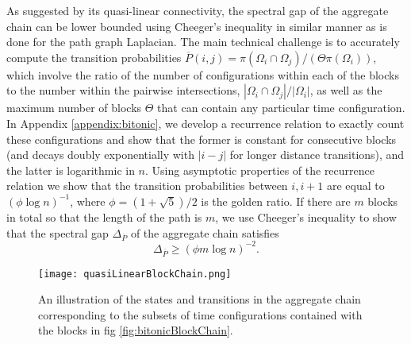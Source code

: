\documentclass[11pt,letterpaper]{article}
\theoremstyle{definition}
\theoremstyle{remark}
\renewcommand{\geq}{\geqslant}
\numberwithin{equation}{section}
\theoremstyle{definition}
\begin{document}
As suggested by its quasi-linear connectivity, the spectral gap of the aggregate chain can be lower bounded using Cheeger's inequality in similar manner as is done for the path graph Laplacian.  The main technical challenge is to accurately compute the transition probabilities $\overline{P}(i,j) = \pi(\Omega_i \cap \Omega_j) / \left(\Theta \pi(\Omega_i)\right)$, which involve the ratio of the number of configurations within each of the blocks to the number within the pairwise intersections, $|\Omega_i \cap \Omega_j| / |\Omega_i|$, as well as the maximum number of blocks $\Theta$ that can contain any particular time configuration.  In Appendix \ref{appendix:bitonic}, we develop a recurrence relation to exactly count these configurations and show that the former is constant for consecutive blocks (and decays doubly exponentially with $|i - j|$ for longer distance transitions), and the latter is logarithmic in $n$.  Using asymptotic properties of the recurrence relation we show that the transition probabilities between $i,i+1$ are equal to $(\phi\log n)^{-1}$, where $\phi = (1 + \sqrt{5})/2$ is the golden ratio.  If there are $m$ blocks in total so that the length of the path is $m$, we use Cheeger's inequality to show that the spectral gap $\Delta_{\overline{P}}$ of the aggregate chain satisfies
\begin{equation}
\Delta_{\overline{P}} \geq \left(\phi m \log n\right)^{-2} . \label{eq:gapOverlineP}
\end{equation}


\begin{figure}[h!]
\begin{center}
\texttt{[image: quasiLinearBlockChain.png]}
\end{center}
\caption{An illustration of the states and transitions in the aggregate chain corresponding to the subsets of time configurations contained with the blocks in fig \ref{fig:bitonicBlockChain}. \label{fig:aggregateChain}}
\end{figure}
\end{document}
